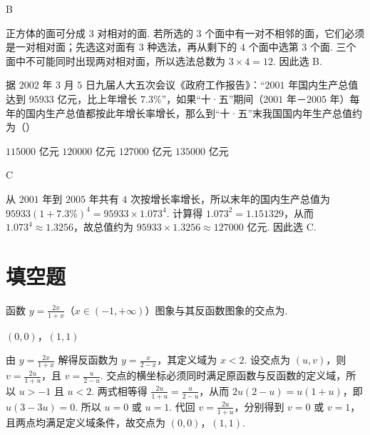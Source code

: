 \begin{answer}
B
\end{answer}

\begin{solution}
正方体的面可分成 \(3\) 对相对的面. 若所选的 \(3\) 个面中有一对不相邻的面，它们必须是一对相对面；先选这对面有 \(3\) 种选法，再从剩下的 \(4\) 个面中选第 \(3\) 个面. 三个面中不可能同时出现两对相对面，所以选法总数为 \(3\times4=12\). 因此选 B.
\end{solution}

\begin{problem}
据 \(2002\text{ 年}\) \(3\text{ 月}\) \(5\text{ 日}\)九届人大五次会议《政府工作报告》：“\(2001\text{ 年}\)国内生产总值达到 \(95933\text{ 亿元}\)，比上年增长 \(7.3\%\)”，如果“十·五”期间（\(2001\text{ 年}\)－\(2005\text{ 年}\)）每年的国内生产总值都按此年增长率增长，那么到“十·五”末我国国内年生产总值约为（\quad）

\choices
    {\(115000\text{ 亿元}\)}
    {\(120000\text{ 亿元}\)}
    {\(127000\text{ 亿元}\)}
    {\(135000\text{ 亿元}\)}
\end{problem}

\begin{answer}
C
\end{answer}

\begin{solution}
从 \(2001\) 年到 \(2005\) 年共有 \(4\) 次按增长率增长，所以末年的国内生产总值为
\(95933(1+7.3\%)^{4}=95933\times1.073^{4}\). 计算得 \(1.073^{2}=1.151329\)，从而 \(1.073^{4}\approx1.3256\)，故总值约为 \(95933\times1.3256\approx127000\) 亿元. 因此选 C.
\end{solution}

\section{填空题}
\begin{problem}
函数 \(y = \frac{2x}{1 + x}\)（\(x \in (-1, +\infty)\)）图象与其反函数图象的交点为\fillinblank{}.
\end{problem}

\begin{answer}
\((0,0)\)，\((1,1)\)
\end{answer}

\begin{solution}
由 \(y=\frac{2x}{1+x}\) 解得反函数为 \(y=\frac{x}{2-x}\)，其定义域为 \(x<2\). 设交点为 \((u,v)\)，则
\(v=\frac{2u}{1+u}\)，且 \(v=\frac{u}{2-u}\). 交点的横坐标必须同时满足原函数与反函数的定义域，所以 \(u>-1\) 且 \(u<2\). 两式相等得
\(\frac{2u}{1+u}=\frac{u}{2-u}\)，从而 \(2u(2-u)=u(1+u)\)，即 \(u(3-3u)=0\). 所以 \(u=0\) 或 \(u=1\). 代回 \(v=\frac{2u}{1+u}\)，分别得到 \(v=0\) 或 \(v=1\)，且两点均满足定义域条件，故交点为 \((0,0)\)，\((1,1)\).
\end{solution}


